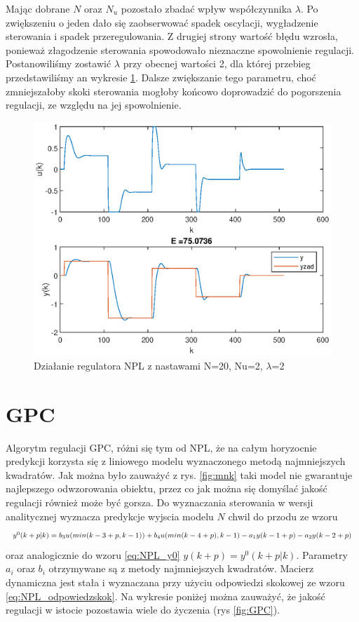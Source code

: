 		\newpage
		Mając dobrane $N$ oraz $N_u$ pozostało zbadać wpływ współczynnika $\lambda$. Po zwiększeniu o jeden dało się zaobserwować spadek oscylacji, wygładzenie sterowania i spadek przeregulowania. Z drugiej strony wartość błędu wzrosła, ponieważ złagodzenie sterowania spowodowało nieznaczne spowolnienie regulacji. Postanowiliśmy zostawić $\lambda$ przy obecnej wartości 2, dla której przebieg przedstawiliśmy an wykresie \ref{fig:NPL4}. Dalsze zwiększanie tego parametru, choć zmniejszałoby skoki sterowania mogłoby końcowo doprowadzić do pogorszenia regulacji, ze względu na jej spowolnienie.
		\begin{figure}[h!]
			\centering
			\includegraphics[width=\linewidth]{img/NPLlam2.eps}
			\caption{Działanie regulatora NPL z nastawami N=20, Nu=2, $\lambda$=2}
			\label{fig:NPL4}
		\end{figure}
		
	\newpage	
	\section{GPC}
		\label{sec:GPC}
		Algorytm regulacji GPC, różni się tym od NPL, że na całym horyzocnie predykcji korzysta się z liniowego modelu wyznaczonego metodą najmniejszych kwadratów. Jak można było zauważyć z rys. \ref{fig:mnk} taki model nie gwarantuje najlepszego odwzorowania obiektu, przez co jak można się domyślać jakość regulacji również może być gorsza.
		Do wyznaczania sterowania w wersji analitycznej wyznacza predykcje wyjscia modelu $N$ chwil do przodu ze wzoru
		\begin{equation}
		\begin{tabular}{l}
		$y^0(k+p|k)=b_3u(min(k-3+p,k-1))+b_4u(min(k-4+p),k-1)-a_1y(k-1+p)-a_2y(k-2+p)$
		\end{tabular}
		\label{eq:GPC_y0}
		\end{equation}
		oraz analogicznie do wzoru \ref{eq:NPL_y0} $y(k+p)=y^0(k+p|k)$. Parametry $a_i$ oraz $b_i$ otrzymywane są z metody najmniejszych kwadratów. Macierz dynamiczna jest stała i wyznaczana przy użyciu odpowiedzi skokowej ze wzoru \ref{eq:NPL_odpowiedzskok}. Na wykresie poniżej można zauważyć, że jakość regulacji w istocie pozostawia wiele do życzenia (rys \ref{fig:GPC}).
		
